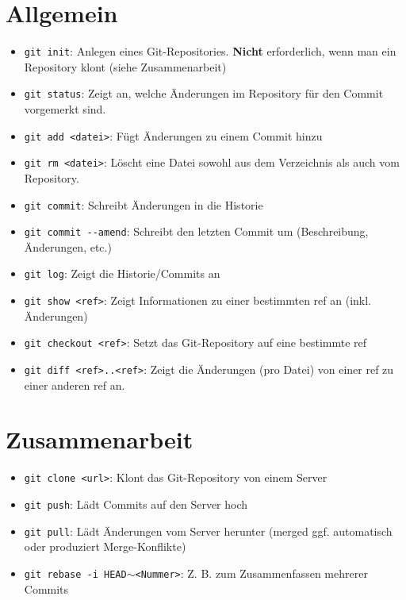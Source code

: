 \documentclass[accentcolor=tud8b,colorbacktitle,12pt]{tudexercise}
\begin{document}
\section*{Allgemein}
\begin{itemize}
	\item \lstinline|git init|: Anlegen eines Git-Repositories. \textbf{Nicht} erforderlich, wenn man ein Repository klont (siehe Zusammenarbeit)
	\item \lstinline|git status|: Zeigt an, welche Änderungen im Repository für den Commit vorgemerkt sind.
	\item \lstinline|git add <datei>|: Fügt Änderungen zu einem Commit hinzu
	\item \lstinline|git rm <datei>|: Löscht eine Datei sowohl aus dem Verzeichnis als auch vom Repository.
	\item \lstinline|git commit|: Schreibt Änderungen in die Historie
	\item \lstinline|git commit --amend|: Schreibt den letzten Commit um (Beschreibung, Änderungen, etc.)
	\item \lstinline|git log|: Zeigt die Historie/Commits an
	\item \lstinline|git show <ref>|: Zeigt Informationen zu einer bestimmten ref an (inkl. Änderungen)
	\item \lstinline|git checkout <ref>|: Setzt das Git-Repository auf eine bestimmte ref
	\item \lstinline|git diff <ref>..<ref>|: Zeigt die Änderungen (pro Datei) von einer ref zu einer anderen ref an.
\end{itemize}

\section*{Zusammenarbeit}
\begin{itemize}
	\label{CollabClone}
	\item \lstinline|git clone <url>|: Klont das Git-Repository von einem Server
	\item \lstinline|git push|: Lädt Commits auf den Server hoch
	\item \lstinline|git pull|: Lädt Änderungen vom Server herunter (merged ggf. automatisch oder produziert Merge-Konflikte)
	\item \lstinline|git rebase -i HEAD|$\sim$\lstinline|<Nummer>|: Z. B. zum Zusammenfassen mehrerer Commits
\end{itemize}
\end{document}
